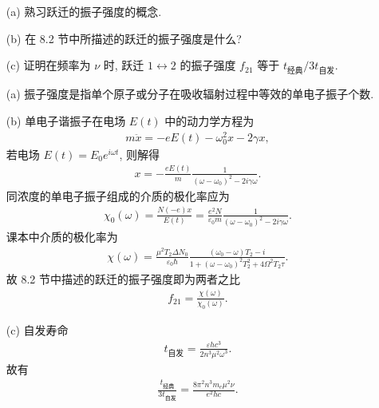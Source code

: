 \documentclass[twoside]{note}
\begin{document}
\begin{exe}
    \begin{itemize}
        \item[(a)] 熟习跃迁的振子强度的概念.
        \item[(b)] 在 8.2 节中所描述的跃迁的振子强度是什么?
        \item[(c)] 证明在频率为 $\nu$ 时, 跃迁 $1\leftrightarrow 2$ 的振子强度 $f_{21}$ 等于 $t_{\text{经典}}/3t_{\text{自发}}$.
    \end{itemize}
\end{exe}
\begin{sol}
    \begin{itemize}
        \item[(a)] 振子强度是指单个原子或分子在吸收辐射过程中等效的单电子振子个数.
        \item[(b)] 单电子谐振子在电场 $E(t)$ 中的动力学方程为
        \begin{align}
            m\ddot{x}=-eE(t)-\omega_0^2x-2\gamma x,
        \end{align}
        若电场 $E(t)=E_0e^{i\omega t}$, 则解得
        \begin{align}
            x=-\frac{eE(t)}{m}\frac{1}{(\omega-\omega_0)^2-2i\gamma\omega}.
        \end{align}
        同浓度的单电子振子组成的介质的极化率应为
        \begin{align}
            \chi_0(\omega)=\frac{N(-e)x}{E(t)}=\frac{e^2N}{\varepsilon_0m}\frac{1}{(\omega-\omega_0)^2-2i\gamma\omega}.
        \end{align}
        课本中介质的极化率为
        \begin{align}
            \chi(\omega)=\frac{\mu^2T_2\Delta N_0}{\varepsilon_0\hbar}\frac{(\omega_0-\omega)T_2-i}{1+(\omega-\omega_0)^2T_2^2+4\Omega^2T_2\tau}.
        \end{align}
        故 8.2 节中描述的跃迁的振子强度即为两者之比
        \begin{align}
            f_{21}=\frac{\chi(\omega)}{\chi_0(\omega)}.
        \end{align}
        \item[(c)] 自发寿命
        \begin{align}
            t_{\text{自发}}=\frac{\varepsilon hc^3}{2n^3\mu^2\omega^3}.
        \end{align}
        故有
        \begin{align}
            \frac{t_{\text{经典}}}{3t_{\text{自发}}}=\frac{8\pi^2n^3m_e\mu^2\nu}{e^2hc}.
        \end{align}
    \end{itemize}%
\end{sol}
\end{document}
